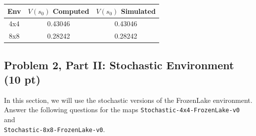 \documentclass[12pt]{article}
\begin{document}
\begin{enumerate}[a)]
\begin{solution}
\begin{center}
  \begin{tabular}{|c|c|c|}\hline
    {\bf Env} & {\bf $V(s_0)$ Computed} & {\bf $V(s_0)$ Simulated}  \\ \hline
    4x4  & 0.43046 & 0.43046 \\ \hline
    8x8  & 0.28242 & 0.28242 \\ \hline
  \end{tabular}
\end{center}
\end{solution}

\end{enumerate}

\subsection*{Problem 2, Part II: Stochastic Environment (10 pt)}

In this section, we will use the stochastic versions of the FrozenLake environment. Answer the following questions for the maps
\texttt{Stochastic-4x4-FrozenLake-v0} and \\
\texttt{Stochastic-8x8-FrozenLake-v0}.
\end{document}
